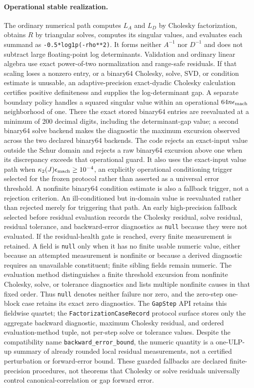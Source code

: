 \paragraph{Operational stable realization.}
The ordinary numerical path computes $L_A$ and $L_D$ by Cholesky
factorization, obtains $R$ by triangular solves, computes its singular values,
and evaluates each summand as
\texttt{-0.5*log1p(-rho**2)}.  It forms neither $A^{-1}$ nor $D^{-1}$ and does
not subtract large floating-point log determinants.  Validation and ordinary
linear algebra use exact power-of-two normalization and range-safe residuals.
If that scaling loses a nonzero entry, or a binary64 Cholesky, solve, SVD, or
condition estimate is unusable, an adaptive-precision exact-dyadic Cholesky
calculation certifies positive definiteness and supplies the log-determinant
gap.  A separate boundary policy handles a squared singular value within an
operational $64n\epsilon_{\rm mach}$ neighborhood of one.  There the exact
stored binary64 entries are reevaluated at a minimum of 200 decimal digits,
including the determinant-gap value; a second binary64 solve backend makes the
diagnostic the maximum excursion observed across the two declared binary64
backends.
The code rejects an exact-input value outside the Schur domain and rejects a
raw binary64 excursion above one when its discrepancy exceeds that operational
guard.  It also uses the exact-input value path when
$\kappa_2(J)\epsilon_{\rm mach}\geq10^{-4}$, an explicitly operational
conditioning trigger selected for the frozen protocol rather than asserted as
a universal error threshold.  A nonfinite binary64 condition estimate is also
a fallback trigger, not a rejection criterion.  An ill-conditioned but
in-domain value is reevaluated rather than rejected merely for triggering that
path.  An early high-precision fallback selected before residual evaluation
records the Cholesky residual, solve residual, residual tolerance, and
backward-error diagnostics as \texttt{null} because they were not evaluated.
If the residual-health gate is reached, every finite measurement is retained.
A field is \texttt{null} only when it has no finite usable numeric value,
either because an attempted measurement is nonfinite or because a derived
diagnostic requires an unavailable constituent; finite sibling fields remain
numeric.  The evaluation method distinguishes a finite threshold
excursion from nonfinite Cholesky, solve, or tolerance diagnostics and lists
multiple nonfinite causes in that fixed order.  Thus \texttt{null} denotes
neither failure nor zero, and the zero-step one-block case retains its exact
zero diagnostics.  The \texttt{GapStep} API retains this fieldwise quartet;
the \texttt{FactorizationCaseRecord} protocol surface stores only the aggregate
backward diagnostic, maximum Cholesky residual, and ordered evaluation-method
tuple, not per-step solve or tolerance values.  Despite the compatibility name
\texttt{backward\_error\_bound}, the numeric quantity is a one-ULP-up summary
of already rounded local residual measurements, not a certified perturbation
or forward-error bound.  These guarded fallbacks are declared
finite-precision procedures, not theorems that
Cholesky or solve residuals universally control canonical-correlation or gap
forward error. 


